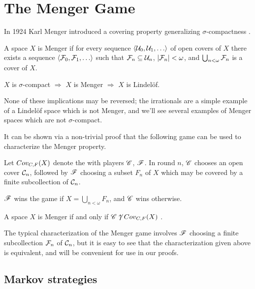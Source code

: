 
\chapter{The Menger Game}

In 1924 Karl Menger introduced a covering property generalizing
$\sigma$-compactness \cite{custom31879423}.

\begin{defn}
  A space $X$ is Menger if for every sequence $\<\mc U_0,\mc U_1,\dots\>$
  of open covers of $X$ there exists a sequence
  $\<\mc F_0,\mc F_1,\dots\>$ such that $\mathcal{F}_n\subseteq \mathcal{U}_n$,
  $|\mathcal{F}_n|<\omega$, and $\bigcup_{n<\omega}\mathcal{F}_n$ is a cover of $X$.
\end{defn}

\begin{prop}
  $X$ is $\sigma$-compact
    $\Rightarrow$
  $X$ is Menger
    $\Rightarrow$
  $X$ is Lindel\"of.
\end{prop}

None of these implications may be reversed; the irrationals are a simple example
of a Lindel\"of space which is not Menger, and we'll see several examples of
Menger spaces which are not $\sigma$-compact.

It can be shown via a non-trivial
proof that the following game can be used to characterize the Menger property.

\begin{game}
  Let $Cov_{C,F}(X)$ denote the  with players $\mathscr{C}$, $\mathscr{F}$.
  In round $n$, $\mathscr{C}$ chooses an open cover $\mathcal{C}_n$, followed by $\mathscr{F}$
  choosing a subset $F_n$ of $X$ which may be covered by a
  finite subcollection of $\mathcal{C}_n$.

  $\mathscr{F}$ wins the game if $X = \bigcup_{n<\omega}F_n$,
  and $\mathscr{C}$ wins otherwise.
\end{game}

\begin{thm}
  A space $X$ is Menger if and only if $\mathscr{C}\not\uparrow Cov_{C,F}(X)$
  \cite{MR1544773}.
\end{thm}

The typical characterization of the Menger game involves $\mathscr{F}$ choosing
a finite subcollection $\mathcal{F}_n$ of $\mathcal{C}_n$, but it is easy to see that the
characterization given above is equivalent, and will be convenient for use
in our proofs.


\section{Markov strategies}

